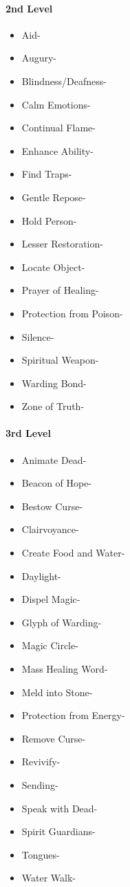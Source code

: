 \documentclass[
]{article}
\providecommand{\tightlist}{%
  \setlength{\itemsep}{0pt}\setlength{\parskip}{0pt}}
\begin{document}
\hypertarget{2nd-level-1}{%
\paragraph{2nd Level}\label{2nd-level-1}}

\begin{itemize}
\tightlist
\item
  Aid-
\item
  Augury-
\item
  Blindness/Deafness-
\item
  Calm Emotions-
\item
  Continual Flame-
\item
  Enhance Ability-
\item
  Find Traps-
\item
  Gentle Repose-
\item
  Hold Person-
\item
  Lesser Restoration-
\item
  Locate Object-
\item
  Prayer of Healing-
\item
  Protection from Poison-
\item
  Silence-
\item
  Spiritual Weapon-
\item
  Warding Bond-
\item
  Zone of Truth-
\end{itemize}

\hypertarget{3rd-level-1}{%
\paragraph{3rd Level}\label{3rd-level-1}}

\begin{itemize}
\tightlist
\item
  Animate Dead-
\item
  Beacon of Hope-
\item
  Bestow Curse-
\item
  Clairvoyance-
\item
  Create Food and Water-
\item
  Daylight-
\item
  Dispel Magic-
\item
  Glyph of Warding-
\item
  Magic Circle-
\item
  Mass Healing Word-
\item
  Meld into Stone-
\item
  Protection from Energy-
\item
  Remove Curse-
\item
  Revivify-
\item
  Sending-
\item
  Speak with Dead-
\item
  Spirit Guardians-
\item
  Tongues-
\item
  Water Walk-
\end{itemize}
\end{document}
